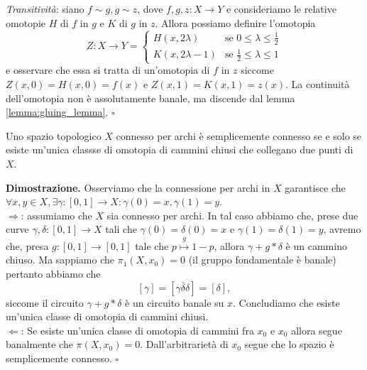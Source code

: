    \emph{Transitività}: siano $f \sim g, g \sim z$, dove $f, g, z : X \to Y$ e consideriamo le relative omotopie $H$ di $f$ in $g$ e $K$ di $g$ in $z$. Allora possiamo definire l'omotopia
    $$
        Z: X \to Y = \begin{cases}
            H(x, 2\lambda) & \text{se } 0 \leq \lambda \leq \frac{1}{2} \\
            K(x, 2\lambda - 1) & \text{se } \frac{1}{2} \leq \lambda \leq 1
        \end{cases}
    $$
    e osservare che essa si tratta di un'omotopia di $f$ in $z$ siccome $Z(x, 0) = H(x, 0) = f(x)$ e $Z(x, 1) = K(x, 1) = z(x)$. La continuità dell'omotopia non è assolutamente banale, ma discende dal lemma \ref{lemma:gluing_lemma}.
\hfill $\square$
%
\vspace{0.5cm}
\begin{prop}
    Uno spazio topologico $X$ connesso per archi è semplicemente connesso se e solo se esiste un'unica classse di omotopia di cammini chiusi che collegano due punti di $X$.
\end{prop}
%
\noindent \textbf{Dimostrazione. }
    Osserviamo che la connessione per archi in $X$ garantisce che $\forall x, y \in X, \exists \gamma: [0, 1] \to X : \gamma(0) = x, \gamma(1) = y$. \\
    $\boxed{\Rightarrow}$: assumiamo che $X$ sia connesso per archi. In tal caso abbiamo che, prese due curve $\gamma, \delta : [0, 1] \to X$ tali che $\gamma(0) = \delta(0) = x$ e $\gamma(1) = \delta(1) = y$, avremo che,
    presa $g : [0, 1] \to [0, 1]$ tale che $p \stackrel{g}{\mapsto} 1 - p$, allora $\gamma + g*\delta$ è un cammino chiuso. Ma sappiamo che $\pi_1(X, x_0) = 0$ (il gruppo fondamentale è banale) pertanto abbiamo che
    $$
    [\gamma] = [\gamma \bar{\delta} \delta] = [\delta],
    $$
    siccome il circuito $\gamma + g*\delta$ è un circuito banale su $x$. Concludiamo che esiste un'unica classe di omotopia di cammini chiusi. \\
    $\boxed{\Leftarrow}$: Se esiste un'unica classe di omotopia di cammini fra $x_0$ e $x_0$ allora segue banalmente che $\pi(X, x_0) = 0$. Dall'arbitrarietà di $x_0$ segue che lo spazio è semplicemente connesso. 
\hfill $\square$
%
